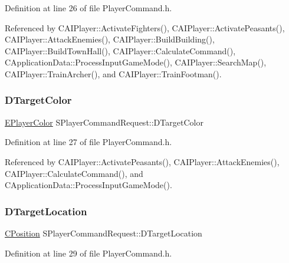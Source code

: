Definition at line 26 of file Player\+Command.\+h.



Referenced by C\+A\+I\+Player\+::\+Activate\+Fighters(), C\+A\+I\+Player\+::\+Activate\+Peasants(), C\+A\+I\+Player\+::\+Attack\+Enemies(), C\+A\+I\+Player\+::\+Build\+Building(), C\+A\+I\+Player\+::\+Build\+Town\+Hall(), C\+A\+I\+Player\+::\+Calculate\+Command(), C\+Application\+Data\+::\+Process\+Input\+Game\+Mode(), C\+A\+I\+Player\+::\+Search\+Map(), C\+A\+I\+Player\+::\+Train\+Archer(), and C\+A\+I\+Player\+::\+Train\+Footman().

\hypertarget{structSPlayerCommandRequest_a3690a5117efe6214d92f18d672b5714f}{}\label{structSPlayerCommandRequest_a3690a5117efe6214d92f18d672b5714f} 
\subsubsection{\texorpdfstring{D\+Target\+Color}{DTargetColor}}
{\footnotesize\ttfamily \hyperlink{GameDataTypes_8h_aafb0ca75933357ff28a6d7efbdd7602f}{E\+Player\+Color} S\+Player\+Command\+Request\+::\+D\+Target\+Color}



Definition at line 27 of file Player\+Command.\+h.



Referenced by C\+A\+I\+Player\+::\+Activate\+Peasants(), C\+A\+I\+Player\+::\+Attack\+Enemies(), C\+A\+I\+Player\+::\+Calculate\+Command(), and C\+Application\+Data\+::\+Process\+Input\+Game\+Mode().

\hypertarget{structSPlayerCommandRequest_a701702b94ca2fd2738e95ef6711dd41a}{}\label{structSPlayerCommandRequest_a701702b94ca2fd2738e95ef6711dd41a} 
\subsubsection{\texorpdfstring{D\+Target\+Location}{DTargetLocation}}
{\footnotesize\ttfamily \hyperlink{classCPosition}{C\+Position} S\+Player\+Command\+Request\+::\+D\+Target\+Location}



Definition at line 29 of file Player\+Command.\+h.



